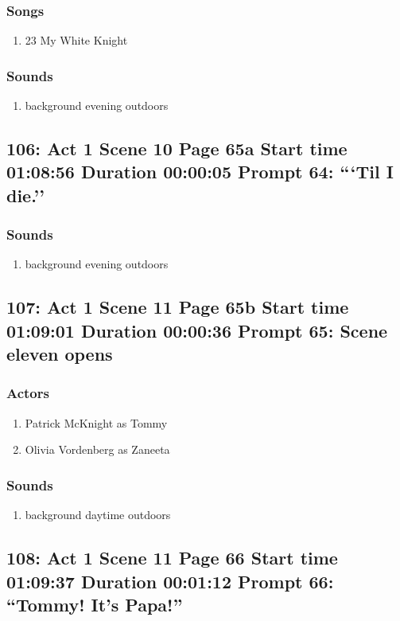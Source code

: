 \subsubsection{Songs}
\begin{enumerate}
\item 23 My White Knight
\end{enumerate}\subsubsection{Sounds}
\begin{enumerate}
\item background evening outdoors
\end{enumerate}
\subsection{106: Act 1 Scene 10 Page 65a Start time 01:08:56 Duration 00:00:05 Prompt 64: ```Til I die.''}
\subsubsection{Sounds}
\begin{enumerate}
\item background evening outdoors
\end{enumerate}
\subsection{107: Act 1 Scene 11 Page 65b Start time 01:09:01 Duration 00:00:36 Prompt 65: Scene eleven opens}

\subsubsection{Actors}
\begin{enumerate}
\item Patrick McKnight as Tommy
\item Olivia Vordenberg as Zaneeta
\end{enumerate}

\subsubsection{Sounds}
\begin{enumerate}
\item background daytime outdoors
\end{enumerate}
\subsection{108: Act 1 Scene 11 Page 66 Start time 01:09:37 Duration 00:01:12 Prompt 66: ``Tommy!  It's Papa!''}

